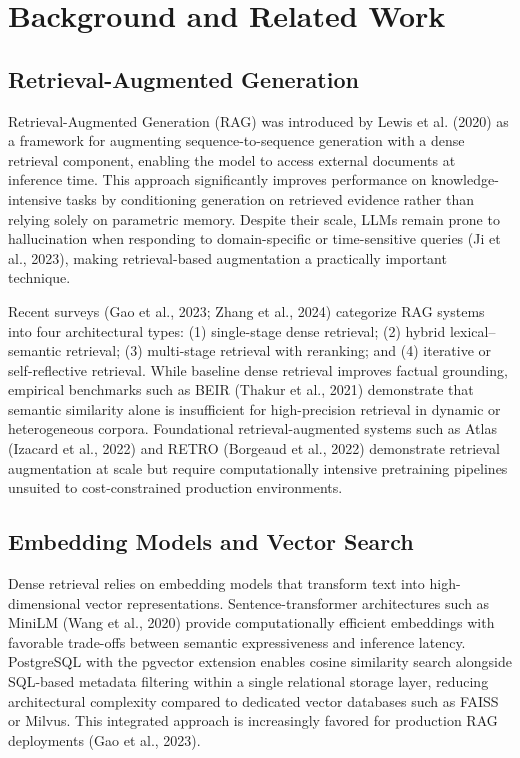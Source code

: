 \documentclass[12pt,a4paper]{report}
\begin{document}
\chapter{Background and Related Work}

\section{Retrieval-Augmented Generation}
\label{sec:lit_rag}

Retrieval-Augmented Generation (RAG) was introduced by Lewis et al. (2020) as a framework for augmenting sequence-to-sequence generation with a dense retrieval component, enabling the model to access external documents at inference time. This approach significantly improves performance on knowledge-intensive tasks by conditioning generation on retrieved evidence rather than relying solely on parametric memory. Despite their scale, LLMs remain prone to hallucination when responding to domain-specific or time-sensitive queries (Ji et al., 2023), making retrieval-based augmentation a practically important technique.

Recent surveys (Gao et al., 2023; Zhang et al., 2024) categorize RAG systems into four architectural types: (1) single-stage dense retrieval; (2) hybrid lexical--semantic retrieval; (3) multi-stage retrieval with reranking; and (4) iterative or self-reflective retrieval. While baseline dense retrieval improves factual grounding, empirical benchmarks such as BEIR (Thakur et al., 2021) demonstrate that semantic similarity alone is insufficient for high-precision retrieval in dynamic or heterogeneous corpora. Foundational retrieval-augmented systems such as Atlas (Izacard et al., 2022) and RETRO (Borgeaud et al., 2022) demonstrate retrieval augmentation at scale but require computationally intensive pretraining pipelines unsuited to cost-constrained production environments.

\section{Embedding Models and Vector Search}
\label{sec:lit_embed}

Dense retrieval relies on embedding models that transform text into high-dimensional vector representations. Sentence-transformer architectures such as MiniLM (Wang et al., 2020) provide computationally efficient embeddings with favorable trade-offs between semantic expressiveness and inference latency. PostgreSQL with the pgvector extension enables cosine similarity search alongside SQL-based metadata filtering within a single relational storage layer, reducing architectural complexity compared to dedicated vector databases such as FAISS or Milvus. This integrated approach is increasingly favored for production RAG deployments (Gao et al., 2023).
\end{document}
